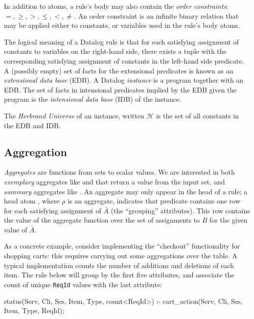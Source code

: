 In addition to atoms, a rule's body may also contain the {\em order
constraints}: $=, \geq, >, \leq, <, \neq$.  An order constraint is an infinite
binary relation that may be applied either to constants, or variables used in
the rule's body atoms.

The logical meaning of a Datalog rule is that for each satisfying assignment of
constants to variables on the right-hand side, there exists a tuple with the
corresponding satisfying assignment of constants in the left-hand side
predicate.
A (possibly empty) set of facts for the extensional predicates is known as an
{\em extensional data base} (EDB).  A Datalog {\em instance} is a program
together with an EDB.  The set of facts in intensional predicates implied by
the EDB given the program is the {\em intensional data base} (IDB) of the
instance.

The {\em Herbrand Universe} of an instance, written $\mathcal{H}$ is the set of
all constants in the EDB and IDB.

\subsection{Aggregation}

{\em Aggregates} are functions from sets to scalar values.
We are interested in both {\em exemplary} aggregates like  and  that return a value
from the input set, and {\em summary} aggregates like .  An aggregate may only appear in the head
of a rule; a head atom , where $\rho$ is an 
aggregate, indicates that predicate  contains one row for each 
satisfying assignment of $\bar{A}$ (the ``grouping'' attributes).  This row contains the value of the 
aggregate function over the set of assignments to $B$ for the given value of 
$\bar{A}$.

As a concrete example, consider implementing the ``checkout'' functionality for shopping carts: this requires carrying out some aggregations over the  table.
A typical implementation counts the number of additions and deletions 
of each item.  The rule below will group by the first five attributes, and associate the
count of unique {\tt ReqId} values with the last attribute: 

\noindent{}
\begin{Dedalus}

status(Serv, Cli, Ses, Item, Type, count<ReqId>) :- 
  cart\_action(Serv, Cli, Ses, Item, Type, ReqId);
\end{Dedalus}

